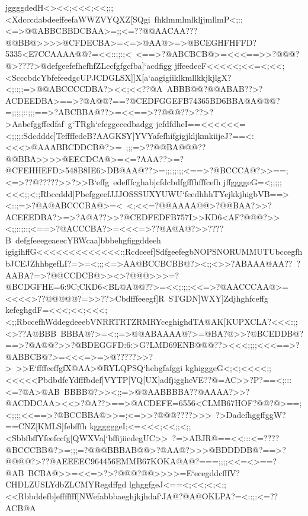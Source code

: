 {{ \hbox{jggggdedH<><<;<<<;<<;;;<XdcccdabdeeffeefaWWZVYQXZ[SQgi%
 fhklmmlmlkljjmllmP<;:;<=>@@ABBCBBDCBAA>=;;<=??@@AACAA???@@BB@>>>>@CFDECBA>=<=>@AA@>=>@BCEGHFHFFD?5335<E7CCAAAA@@?=<<::;;:;<%
 <==>?@ABCBCB@>=<<<==>>?@@@?@>????>@defgeefefhcfhfZLccfgfgcfba]`acdfigg}
 \hbox{jffeedecF<<<<<;<<=<;<<;<ScccbdcYbfefeedgcUPJCDGLSX]]X[a`aagigiiklkmllkkjkjlgX?<;::;;=>@@ABCCCCDBA?><<;<<??@A%
 ABBB@@?@@ABAB??>?ACDEEDBA>==>?@A@@?==?@CEDFGGEFB74365BD6BBA@A@@@?=;;;;;::;;;==>?ABCBBA@??>=<<==>??@@@??>??>?>Aabefggffedfaf%
 g`TRgh`efeggeccdbadgg}
 \hbox{jefdfdheI==<<<<<<=<;;;;:Sdcdddc]TeffffedeB?AAGKSY]YVYafefhifgigjkljkmkiijeJ?==<:<<<>@AAABBCDDCB@?>=%
 ;;;=>??@@BA@@@??@@BBA>>>>@EECDCA@>=<=?AAA??>=?@CFEHHEFD>548B8IE6>DB@AA@??>=;;;;;:;;<==>?@BCCCA@?>>==;<=>??@?????>>?>>B`effg%
 edefffcghab]cfdcbdfgfffhfffcefh}
 \hbox{jffggggeG=<;;;;;<<<;;<;;Rbccddd]PbefggeefJJJOSSSUXYUWU`feedhhhTYejkkjhigbVB==><::;=>?@A@ABCCCBA@>=<%
 <;<<=?@@AAAA@@>?@@BAA?>>?ACEEEDBA?>=>?A@A??>>?@CEDFEDFB757I>>KD6<AF?@@@?>><;;::;::;<==>?@ACCCBA?>=<<<=>??@A@A@?>>????B%
 defgfeeegeaeecYRWcaa]bbbehgfiggddeeh}
 \hbox{igigihffG<<<<<<<<<<<<<:;Rcdceef]SdfgeefegbNOPSNORUMMUTUbccegfhbJCEJZhhbgefLI?=>=<;;;<=>AA@BCCBCBB@?><;;<>>?ABAAA@AA??%
 ?AABA?=>?@@CCDCB@>><>?@@@>>>=?@BCDGFHE=6:9C;CKD6<BL@A@@??>=<<;:;;;<<=>?@AACCCAA@>=<<<<>??@@@@@?=>>??>Cbdfffeeegf]R%
 STGDN]WXY]Zdjhghfceffg}
 \hbox{kefeghgdF=<<<;<<;<<<;<;;RbccefhWddegdeeebVNRRTRTZRMRYceghighdTA@AK[KUPXCLA?<<<:;;<>??A@BBB%
 BBBA@?>=<:;=>@@ABAAAA@?>=@BA?@>>?@BCEDDB@?==>?@A@@?>>?@BDEGGFD:6:>G?LMD69ENB@@@??><<<;;;;<<<==>?@ABBCB@?>=<<<=>=>@?????>>?>%
 >>E`ffffeeffgfX@AA>@RYLQPSQ`hehgfafggi}
 \hbox{kghigggeG<;<;<<<<;;<<<<<PbdbdfeYdfffbdef]VYTP[VQ[UX]adfjiggheVE??@=AC>>?P?==<;:::<=?@A>@AB%
 BBBB@?>><;;=>@@AABBBBA??@AAAA?>>?@ACDDCAA><<>?@A??>==>@ACDEFE=6556<CLMB67HOF?@@?@>==;<;;;;<<==>?@BCCBBA@>>=;<=>>?@@@????>>>%
 ?>DadefhggffggW?==CNZ[KMLS]febfffh}
 \hbox{kggggggeI;<=<<<;<<;;<;;<SbbfbffYfeefccfg[QWXVa[`bffijiiedegUC>>%
 ?=>ABJR@==<<:::<=????@BCCCBB@?>=;;;=?@@@BBBAB@@>?@AA@?>>>@BDDDDB@?==>?@@@@?>??@AEEEEC964456EMMB67KOKA@A@?===;;;;<<=<>==?@AB%
 BCBA@>>=<<=>?>?@@@?@@>>>>=E`ecegddcfffV?CHDLZUSLYdbZLCMYRegdffgd}
 \hbox{lghggfgeJ<==<;<<;<;<;;<<Rbbddefb]efffffff[NWefabbbaeghjkjhdaf`JA@?@A@OKLPA?=<::;:<=??ACB@A%
}}}
